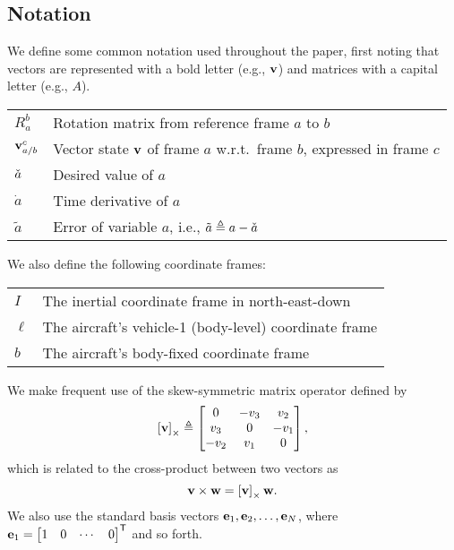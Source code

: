 
\subsection{Notation}

We define some common notation used throughout the paper, first noting that
vectors are represented with a bold letter (e.g., $\bf v$) and matrices with a
capital letter (e.g., $A$).
\begin{center}
\begin{tabularx}{\columnwidth}{lX}
$R_a^b$ & Rotation matrix from reference frame $a$ to $b$ \\
$\boldsymbol{\mathrm{v}}_{a/b}^c$ & Vector state $\boldsymbol{\mathrm{v}}$ of frame $a$ w.r.t.~frame $b$, expressed in frame $c$ \\
$\check{a}$ & Desired value of $a$ \\
$\dot{a}$ & Time derivative of $a$ \\
$\tilde{a}$ & Error of variable $a$, i.e., $\tilde{a} \triangleq a - \check{a}$
\end{tabularx}
\end{center}
%
We also define the following coordinate frames:
\begin{center}
\begin{tabularx}{\columnwidth}{lX}
$I$ & The inertial coordinate frame in north-east-down\\
$\ell$ & The aircraft's vehicle-1 (body-level) coordinate frame \\
$b$ & The aircraft's body-fixed coordinate frame
\end{tabularx}
\end{center}

We make frequent use of the skew-symmetric matrix operator defined by
\begin{equation}
  \left[ \boldsymbol{\mathrm{v}} \right]_{\times} \triangleq
  \begin{bmatrix}
  0 & -v_{3} & v_{2}\\
  v_{3} & 0 & -v_{1}\\
  -v_{2} & v_{1} & 0
  \end{bmatrix},
\end{equation}
which is related to the cross-product between two vectors as
\begin{equation}
  \boldsymbol{\mathrm{v}}\times\boldsymbol{\mathrm{w}}=\left[ \boldsymbol{\mathrm{v}} \right]_{\times}\boldsymbol{\mathrm{w}}.
\end{equation}
We also use the standard basis vectors $\boldsymbol{\mathrm{e}}_1, \boldsymbol{\mathrm{e}}_2, \ldots, \boldsymbol{\mathrm{e}}_N$, where $\boldsymbol{\mathrm{e}}_1 = \begin{bmatrix} 1 & 0 & \cdots & 0 \end{bmatrix}^{\mathsf{T}}$ and so forth.
